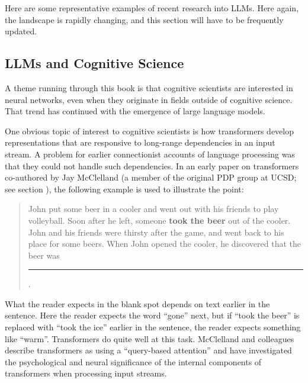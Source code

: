 Here are some representative examples of recent research into LLMs. Here again, the landscape is rapidly changing, and this section will have to be frequently updated.

\subsection{LLMs and Cognitive Science}\label{llm_cogsci}

A theme running through this book is that cognitive scientists are interested in neural networks, even when they originate in fields outside of cognitive science. That trend has continued with the emergence of large language models.

One obvious topic of interest to cognitive scientists is how transformers develop representations that are responsive to long-range dependencies in an input stream. A problem for earlier connectionist accounts of language processing was that they could not handle such dependencies. In an early paper on transformers co-authored by Jay McClelland  \cite{mcclelland2020placing} (a member of the original PDP group at UCSD; see section ), the following example is used to illustrate the point:
\begin{quote}
John put some beer in a cooler and went out with his friends to play volleyball. Soon after he left, someone \textbf{took the beer} out of the cooler. John and his friends were thirsty after the game, and went back to his place for some beers. When John opened the cooler, he discovered that the beer was \rule{1cm}{0.15mm}.
\end{quote}
What the reader expects in the blank spot depends on text earlier in the sentence. Here the reader expects the word ``gone'' next, but if ``took the beer'' is replaced with ``took the ice'' earlier in the sentence, the reader expects something like ``warm''. Transformers do quite well at this task. McClelland and colleagues describe transformers as using a ``query-based attention''  and have investigated the psychological and neural significance of the internal components of transformers when processing input streams. 

